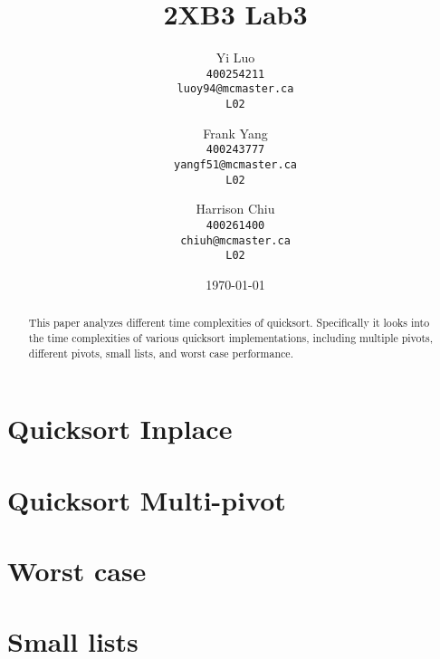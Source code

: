 \documentclass{article}
\title{2XB3 Lab3}
\author{
  Yi Luo\\
  \texttt{400254211}\\
  \texttt{luoy94@mcmaster.ca}\\
  \texttt{L02}
  \and
  Frank Yang\\
  \texttt{400243777}\\
  \texttt{yangf51@mcmaster.ca}\\
  \texttt{L02}
  \and
  Harrison Chiu\\
  \texttt{400261400}\\
  \texttt{chiuh@mcmaster.ca}\\
  \texttt{L02}
}
\date{\today}
\begin{document}
\maketitle

\begin{abstract}
This paper analyzes different time complexities of quicksort. Specifically it looks into the time complexities of various quicksort implementations, including multiple pivots, different pivots, small lists, and worst case performance.
\end{abstract}

\section*{Quicksort Inplace}


\section*{Quicksort Multi-pivot}

\section*{Worst case}



\section*{Small lists}
\end{document}

